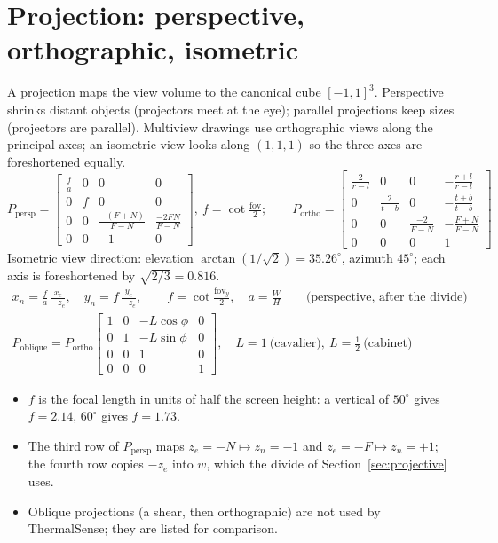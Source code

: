 \section{Projection: perspective, orthographic, isometric}
\label{sec:proj}
A projection maps the view volume to the canonical cube $[-1,1]^3$. Perspective shrinks distant objects
(projectors meet at the eye); parallel projections keep sizes (projectors are parallel). Multiview drawings use
orthographic views along the principal axes; an isometric view looks along $(1,1,1)$ so the three axes are
foreshortened equally.
\begin{equation}\renewcommand{\arraystretch}{1.45}
P_{\text{persp}}=\begin{bmatrix}\frac{f}{a}&0&0&0\\0&f&0&0\\0&0&\frac{-(F+N)}{F-N}&\frac{-2FN}{F-N}\\0&0&-1&0\end{bmatrix},\
f=\cot\tfrac{\text{fov}}{2};\qquad
P_{\text{ortho}}=\begin{bmatrix}\frac{2}{r-l}&0&0&-\frac{r+l}{r-l}\\0&\frac{2}{t-b}&0&-\frac{t+b}{t-b}\\0&0&\frac{-2}{F-N}&-\frac{F+N}{F-N}\\0&0&0&1\end{bmatrix}
\label{eq:proj}
\end{equation}
Isometric view direction: elevation $\arctan(1/\sqrt2)=35.26^\circ$, azimuth $45^\circ$; each axis is foreshortened by
$\sqrt{2/3}=0.816$.
\begin{gather}
x_n=\frac{f}{a}\,\frac{x_e}{-z_e},\quad y_n=f\,\frac{y_e}{-z_e},\qquad f=\cot\frac{\text{fov}_y}{2},\quad a=\frac{W}{H}\qquad\text{(perspective, after the divide)}\label{eq:fov}\\
P_{\text{oblique}}=P_{\text{ortho}}\begin{bmatrix}1&0&-L\cos\phi&0\\0&1&-L\sin\phi&0\\0&0&1&0\\0&0&0&1\end{bmatrix},\quad
L=1\ \text{(cavalier)},\ L=\tfrac12\ \text{(cabinet)}\nonumber
\end{gather}
\begin{itemize}
\item $f$ is the focal length in units of half the screen height: a vertical  of $50^\circ$ gives $f=2.14$, $60^\circ$ gives $f=1.73$.
\item The third row of $P_{\text{persp}}$ maps $z_e=-N\mapsto z_n=-1$ and $z_e=-F\mapsto z_n=+1$; the fourth row copies $-z_e$
into $w$, which the divide of Section~\ref{sec:projective} uses.
\item Oblique projections (a shear, then orthographic) are not used by ThermalSense; they are listed for comparison.
\end{itemize}

